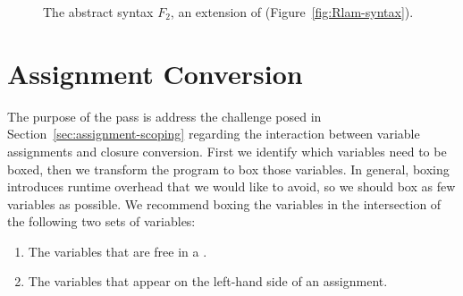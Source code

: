 \documentclass[7x10,nocrop]{TimesAPriori_MIT}%
\newcommand{\gray}[1]{{\color{gray} #1}}
\begin{document}
\begin{figure}[tp]
\centering
\fbox{
\begin{minipage}{0.96\textwidth}
\[
\begin{array}{lcl}
\Exp &::=& \ldots \MID \FUNREFARITY{\Var}{\Int}\\
 \Def &::=& \gray{ \FUNDEF{\Var}{([\Var \code{:} \Type]\ldots)}{\Type}{\code{'()}}{\Exp} }\\
  F_2 &::=& \gray{\PROGRAMDEFS{\code{'()}}{\LP \Def\ldots \RP}}
\end{array}
\]
\end{minipage}
}
\caption{The abstract syntax $F_2$, an extension of \LangLam{}
  (Figure~\ref{fig:Rlam-syntax}).}
\label{fig:f2-syntax}
\end{figure}

\fi

\section{Assignment Conversion}
\label{sec:convert-assignments}

The purpose of the  pass is address the
challenge posed in Section~\ref{sec:assignment-scoping} regarding the
interaction between variable assignments and closure conversion.
First we identify which variables need to be boxed, then we transform
the program to box those variables. In general, boxing introduces
runtime overhead that we would like to avoid, so we should box as few
variables as possible. We recommend boxing the variables in the
intersection of the following two sets of variables:
\begin{enumerate}
\item The variables that are free in a .
\item The variables that appear on the left-hand side of an
  assignment.
\end{enumerate}
\end{document}
